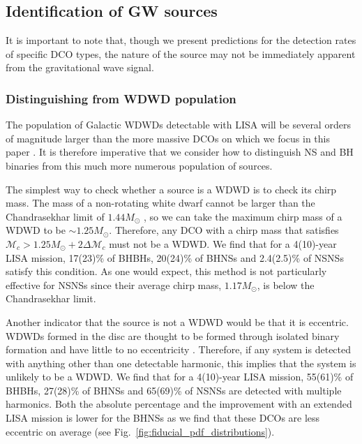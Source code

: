 \subsection{Identification of GW sources}
It is important to note that, though we present predictions for the detection rates of specific DCO types, the nature of the source may not be immediately apparent from the gravitational wave signal.

\subsubsection{Distinguishing from WDWD population}\label{sec:WDWD_distinguish}
The population of Galactic WDWDs detectable with LISA will be several orders of magnitude larger than the more massive DCOs on which we focus in this paper \citep[e.g.][]{Korol+2017}. It is therefore imperative that we consider how to distinguish NS and BH binaries from this much more numerous population of sources.

The simplest way to check whether a source is a WDWD is to check its chirp mass. The mass of a non-rotating white dwarf cannot be larger than the Chandrasekhar limit of $1.44 \unit{M_\odot}$ \citep{Chandrasekhar+1931}, so we can take the maximum chirp mass of a WDWD to be $\sim 1.25 \unit{M_{\odot}}$. Therefore, any DCO with a chirp mass that satisfies $\mathcal{M}_c > 1.25 \unit{M_{\odot}} + 2 \Delta \mathcal{M}_c$ must not be a WDWD. We find that for a 4(10)-year LISA mission, 17(23)\% of BHBHs, 20(24)\% of BHNSs and 2.4(2.5)\% of NSNSs satisfy this condition. As one would expect, this method is not particularly effective for NSNSs since their average chirp mass, $1.17 \unit{M_\odot}$, is below the Chandrasekhar limit.

Another indicator that the source is not a WDWD would be that it is eccentric. WDWDs formed in the disc are thought to be formed through isolated binary formation and have little to no eccentricity \citep[e.g.][]{Nelemans+2001}. Therefore, if any system is detected with anything other than one detectable harmonic, this implies that the system is unlikely to be a WDWD. We find that for a 4(10)-year LISA mission, 55(61)\% of BHBHs, 27(28)\% of BHNSs and 65(69)\% of NSNSs are detected with multiple harmonics. Both the absolute percentage and the improvement with an extended LISA mission is lower for the BHNSs as we find that these DCOs are less eccentric on average (see Fig.~\ref{fig:fiducial_pdf_distributions}).

